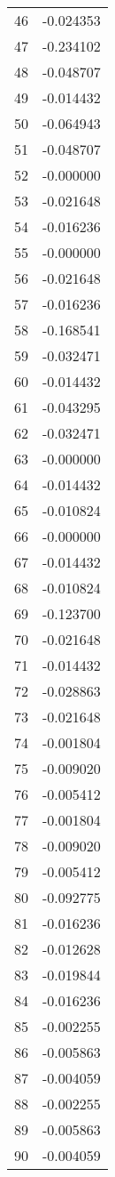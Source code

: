 \documentclass[12pt]{article}
\begin{document}
\begin{longtable}{@{}cc@{}}
46 & -0.024353 \\
47 & -0.234102 \\
48 & -0.048707 \\
49 & -0.014432 \\
50 & -0.064943 \\
51 & -0.048707 \\
52 & -0.000000 \\
53 & -0.021648 \\
54 & -0.016236 \\
55 & -0.000000 \\
56 & -0.021648 \\
57 & -0.016236 \\
58 & -0.168541 \\
59 & -0.032471 \\
60 & -0.014432 \\
61 & -0.043295 \\
62 & -0.032471 \\
63 & -0.000000 \\
64 & -0.014432 \\
65 & -0.010824 \\
66 & -0.000000 \\
67 & -0.014432 \\
68 & -0.010824 \\
69 & -0.123700 \\
70 & -0.021648 \\
71 & -0.014432 \\
72 & -0.028863 \\
73 & -0.021648 \\
74 & -0.001804 \\
75 & -0.009020 \\
76 & -0.005412 \\
77 & -0.001804 \\
78 & -0.009020 \\
79 & -0.005412 \\
80 & -0.092775 \\
81 & -0.016236 \\
82 & -0.012628 \\
83 & -0.019844 \\
84 & -0.016236 \\
85 & -0.002255 \\
86 & -0.005863 \\
87 & -0.004059 \\
88 & -0.002255 \\
89 & -0.005863 \\
90 & -0.004059 \\

\end{longtable}
\end{document}

